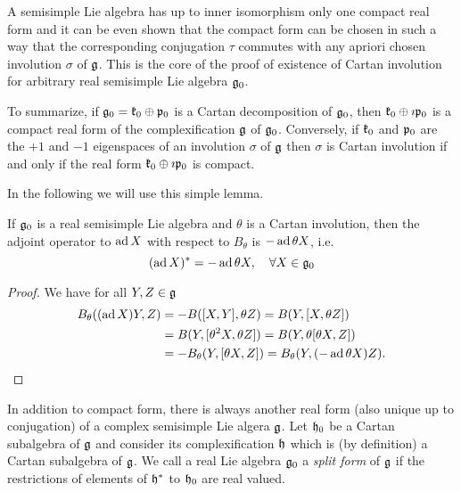 A semisimple Lie algebra has up to inner isomorphism only one compact real form and it can be even shown that the compact form can be chosen in such a way that the corresponding conjugation $\tau$ commutes with any apriori chosen involution $\sigma$ of $\mathfrak{g}$. This is the core of the proof of existence of Cartan involution for arbitrary real semisimple Lie algebra $\mathfrak{g}_0$.

To summarize, if $\mathfrak{g}_0 = \mathfrak{k}_0 \oplus \mathfrak{p}_0$ is a Cartan decomposition of $\mathfrak{g}_0$, then $\mathfrak{k}_0 \oplus \imath \mathfrak{p}_0$ is a compact  real form of the complexification $\mathfrak{g}$ of $\mathfrak{g}_0$. Conversely, if $\mathfrak{k}_0$ and $\mathfrak{p}_0$ are the $+1$ and $-1$ eigenspaces of an involution $\sigma$ of $\mathfrak{g}$ then $\sigma$ is Cartan involution if and only if the real form $\mathfrak{k}_0 \oplus \imath \mathfrak{p}_0$  is compact.

In the following we will use this simple lemma.
\begin{lemma}\label{lem:theta_adjoint}
 If $\mathfrak{g}_0$ is a real semisimple Lie algebra and $\theta$ is a Cartan involution, then the adjoint operator to $\operatorname{\mathrm{ad}} X$ with respect to $B_\theta$ is $-\operatorname{\mathrm{ad}} \theta X$, i.e.
 \begin{equation*}
  (\operatorname{\mathrm{ad}} X)^* = -\operatorname{\mathrm{ad}} \theta X, \quad \forall X\in\mathfrak{g}_0
 \end{equation*}
\end{lemma}
\begin{proof}
  We have for all $Y,Z\in\mathfrak{g}$
  \begin{align*}
  B_\theta((\operatorname{\mathrm{ad}} X)Y,Z) &= -B([X,Y],\theta Z) = B(Y,[X,\theta Z]) \\
                       &= B(Y,[\theta^2 X, \theta Z]) = B(Y,\theta [\theta X, Z]) \\
		       &= -B_\theta(Y,[\theta X,Z]) = B_\theta(Y,(-\operatorname{\mathrm{ad}} \theta X)Z).
  \end{align*}
\end{proof}

In addition to compact form, there is always another real form (also unique up to conjugation) of a complex semisimple Lie algera $\mathfrak{g}$. Let $\mathfrak{h}_0$ be a Cartan subalgebra of $\mathfrak{g}$ and consider its complexification $\mathfrak{h}$ which is (by definition) a Cartan subalgebra of $\mathfrak{g}$. We call a real Lie algebra $\mathfrak{g}_0$ a \emph{split form} of $\mathfrak{g}$ if the restrictions of elements of $\mathfrak{h}^*$ to $\mathfrak{h}_0$ are real valued.

